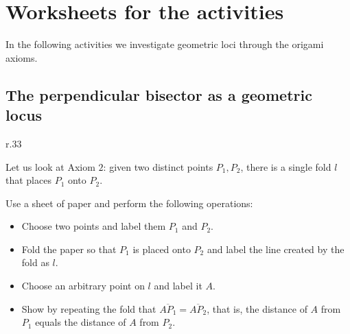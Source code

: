 

\section{Worksheets for the activities}\label{s.discovery}


In the following activities we investigate geometric loci through the origami axioms.

\subsection{The perpendicular bisector as a geometric locus}

\begin{wrapfigure}[4]{r}{.33\textwidth}
\begin{center}
\vspace{-10ex}
\end{center}
\end{wrapfigure}
Let us look at Axiom $2$: given two distinct points $P_1,P_2$, there is a single fold $l$ that places $P_1$ onto $P_2$. 


Use a sheet of paper and perform the following operations:
\begin{itemize}
\item Choose two points and label them $P_1$ and $P_2$.
\item Fold the paper so that $P_1$ is placed onto $P_2$ and label the line created by the fold as $l$.
\item Choose an arbitrary point on $l$ and label it $A$.
\item Show by repeating the fold that $\overline{AP_1}=\overline{AP_2}$, that is, the distance of $A$ from $P_1$ equals the distance of $A$ from $P_2$.
\end{itemize}

